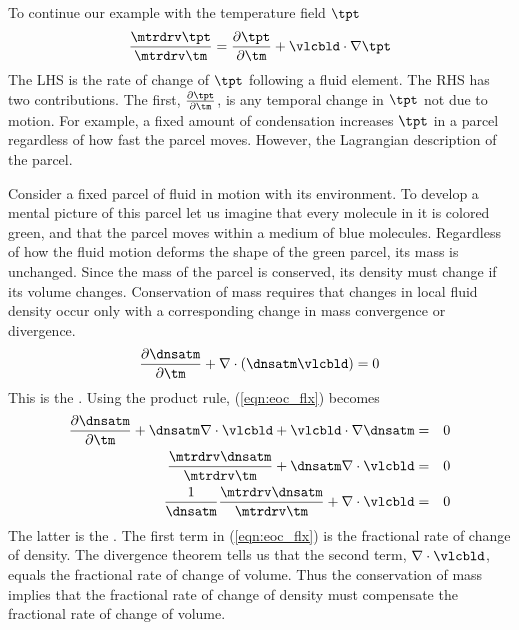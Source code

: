 \documentclass[12pt,twoside]{book}
\begin{document}
To continue our example with the temperature field $\tpt$
\begin{equation}
\frac{\mtrdrv \tpt}{\mtrdrv \tm} = 
\frac{\partial \tpt}{\partial \tm} + \vlcbld \cdot \nabla \tpt
\label{eqn:mtr_drv_tpt}
\end{equation}
The LHS is the rate of change of $\tpt$ following a fluid element.
The RHS has two contributions.
The first, $\frac{\partial \tpt}{\partial \tm}$, is any temporal
change in $\tpt$ not due to motion.
For example, a fixed amount of condensation increases $\tpt$ in a
parcel regardless of how fast the parcel moves.
However, the Lagrangian description of the parcel.

Consider a fixed parcel of fluid in motion with its environment.
To develop a mental picture of this parcel let us imagine that every 
molecule in it is colored green, and that the parcel moves within a
medium of blue molecules.
Regardless of how the fluid motion deforms the shape of the green
parcel, its mass is unchanged.
Since the mass of the parcel is conserved, its density must change if
its volume changes.
Conservation of mass requires that changes in local fluid density 
occur only with a corresponding change in mass convergence or
divergence. 
\begin{equation}
\frac{\partial \dnsatm}{\partial \tm} + 
\nabla \cdot ( \dnsatm \vlcbld ) = 0
\label{eqn:eoc_flx}
\end{equation}
This is the .  
Using the product rule, (\ref{eqn:eoc_flx}) becomes
\begin{eqnarray}
\frac{\partial \dnsatm}{\partial \tm } + 
\dnsatm \nabla \cdot \vlcbld + 
\vlcbld \cdot \nabla \dnsatm & = & 0 \nonumber \\
\frac{\mtrdrv \dnsatm}{\mtrdrv \tm } +
\dnsatm \nabla \cdot \vlcbld & = & 0 \nonumber \\
\frac{1}{\dnsatm } \frac{\mtrdrv \dnsatm}{\mtrdrv \tm } +
\nabla \cdot \vlcbld & = & 0
\label{eqn:eoc_dvr}
\end{eqnarray}
The latter is the . 
The first term in (\ref{eqn:eoc_flx}) is the fractional rate of change
of density.
The divergence theorem tells us that the second term, $\nabla \cdot
\vlcbld$, equals the fractional rate of change of volume. 
Thus the conservation of mass implies that the fractional rate of
change of density must compensate the fractional rate of change of
volume. 
\end{document}
